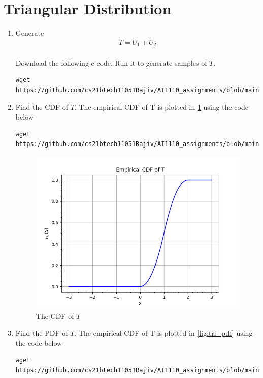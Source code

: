 \documentclass[journal,12pt,twocolumn]{IEEEtran}
\renewcommand\thesection{\arabic{section}}
\begin{document}
\section{Triangular Distribution}
\begin{enumerate}[label=\thesection.\arabic*
,ref=\thesection.\theenumi]
%
\item Generate 
	\begin{align}
		T = U_1+U_2
	\end{align}
\\
\solution Download the following c code. Run it to generate samples of $T$.
\begin{lstlisting}
wget https://github.com/cs21btech11051Rajiv/AI1110_assignments/blob/main/manual1/code/q4/4p1.c
\end{lstlisting}
%
\item Find the CDF of $T$.
\solution The empirical CDF of T is plotted in \ref{fig:tri_cdf} using the code below
\begin{lstlisting}
wget https://github.com/cs21btech11051Rajiv/AI1110_assignments/blob/main/manual1/code/q4/4p2.py
\end{lstlisting}
\begin{figure}[ht!]
	\centering
	\includegraphics[width=\columnwidth]{./figs/fig4.2.png}
	\caption{The CDF of $T$}
	\label{fig:tri_cdf}
\end{figure}
\item Find the PDF of $T$.
\solution The empirical CDF of T is plotted in \ref{fig:tri_pdf} using the code below
\begin{lstlisting}
wget https://github.com/cs21btech11051Rajiv/AI1110_assignments/blob/main/manual1/code/q4/4p3.py

\end{lstlisting}
\end{enumerate}
\end{document}
